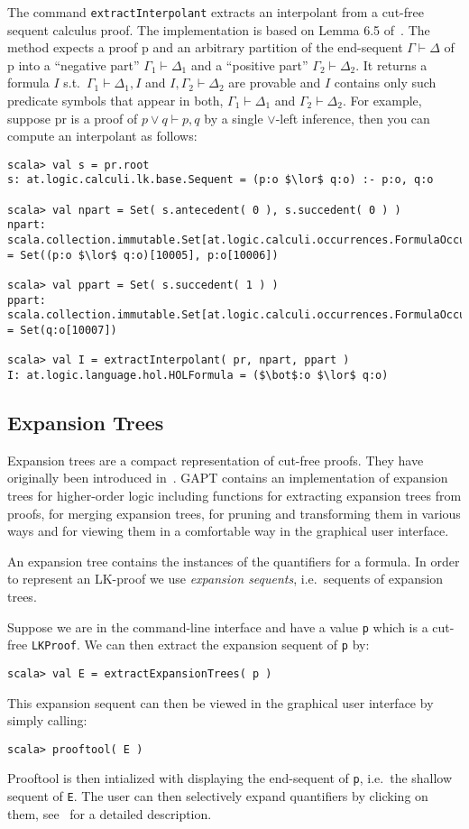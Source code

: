 \documentclass[a4paper,11pt]{article}
\newcommand{\seq}{\vdash}	%
\renewcommand{\lor}{\vee}
\newcommand{\cli}[1]{{\tt {#1}}}
\begin{document}
The command \texttt{extractInterpolant} extracts an interpolant from a cut-free
sequent calculus proof. The implementation is based on Lemma 6.5 of~\cite{Takeuti87Proof}. The method expects
a proof p and an arbitrary partition of the end-sequent $\Gamma \seq \Delta$ of p into a 
``negative part'' $\Gamma_1\seq\Delta_1$ and a ``positive part'' $\Gamma_2 \seq \Delta_2$.
It returns a formula $I$ s.t.\ $\Gamma_1\seq\Delta_1, I$ and $I,\Gamma_2\seq\Delta_2$
are provable and $I$ contains only such predicate symbols that appear in both, $\Gamma_1\seq\Delta_1$
and $\Gamma_2\seq\Delta_2$. For example, suppose pr is a proof of $p \lor q \seq p, q$
by a single $\lor$-left inference, then you can compute an interpolant as follows:
\begin{lstlisting}
scala> val s = pr.root
s: at.logic.calculi.lk.base.Sequent = (p:o $\lor$ q:o) :- p:o, q:o

scala> val npart = Set( s.antecedent( 0 ), s.succedent( 0 ) )
npart: scala.collection.immutable.Set[at.logic.calculi.occurrences.FormulaOccurrence] = Set((p:o $\lor$ q:o)[10005], p:o[10006])

scala> val ppart = Set( s.succedent( 1 ) )
ppart: scala.collection.immutable.Set[at.logic.calculi.occurrences.FormulaOccurrence] = Set(q:o[10007])

scala> val I = extractInterpolant( pr, npart, ppart )
I: at.logic.language.hol.HOLFormula = ($\bot$:o $\lor$ q:o)
\end{lstlisting}

\subsection{Expansion Trees}

Expansion trees are a compact representation of cut-free proofs. They have originally been
introduced in~\cite{Miller87Compact}. GAPT contains an implementation of
expansion trees for higher-order logic including functions for extracting expansion
trees from proofs, for merging expansion trees, for pruning and transforming them
in various ways and for viewing
them in a comfortable way in the graphical user interface.

An expansion tree contains the instances of the quantifiers for a formula. In order
to represent an LK-proof we use {\em expansion sequents}, i.e.~sequents of expansion trees.

Suppose we are in the command-line interface and have a value \cli{p} which is a cut-free \cli{LKProof}.
We can then extract the expansion sequent of \cli{p} by:
\begin{lstlisting}
scala> val E = extractExpansionTrees( p )
\end{lstlisting}
This expansion sequent can then be viewed in the graphical user interface by simply calling:
\begin{lstlisting}
scala> prooftool( E )
\end{lstlisting}
Prooftool is then intialized with displaying the end-sequent of \cli{p}, i.e.\ the shallow sequent
of \cli{E}. The user can then selectively expand quantifiers by clicking on them, see~\cite{Hetzl13Understanding}
for a detailed description.
\end{document}
